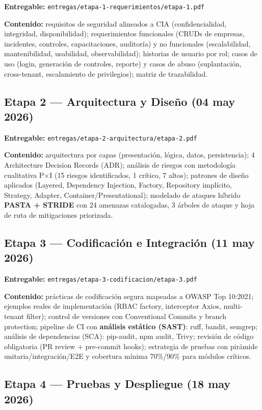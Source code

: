 \documentclass[12pt,a4paper,oneside]{article}
\begin{document}
\textbf{Entregable:} \texttt{entregas/etapa-1-requerimientos/etapa-1.pdf}

\textbf{Contenido:} requisitos de seguridad alineados a CIA (confidencialidad, integridad, disponibilidad); requerimientos funcionales (CRUDs de empresas, incidentes, controles, capacitaciones, auditoría) y no funcionales (escalabilidad, mantenibilidad, usabilidad, observabilidad); historias de usuario por rol; casos de uso (login, generación de controles, reporte) y casos de abuso (suplantación, cross-tenant, escalamiento de privilegios); matriz de trazabilidad.

\subsection{Etapa 2 — Arquitectura y Diseño (04 may 2026)}

\textbf{Entregable:} \texttt{entregas/etapa-2-arquitectura/etapa-2.pdf}

\textbf{Contenido:} arquitectura por capas (presentación, lógica, datos, persistencia); 4 Architecture Decision Records (ADR); análisis de riesgos con metodología cualitativa P×I (15 riesgos identificados, 1 crítico, 7 altos); patrones de diseño aplicados (Layered, Dependency Injection, Factory, Repository implícito, Strategy, Adapter, Container/Presentational); modelado de ataques híbrido \textbf{PASTA + STRIDE} con 24 amenazas catalogadas, 3 árboles de ataque y hoja de ruta de mitigaciones priorizada.

\subsection{Etapa 3 — Codificación e Integración (11 may 2026)}

\textbf{Entregable:} \texttt{entregas/etapa-3-codificacion/etapa-3.pdf}

\textbf{Contenido:} prácticas de codificación segura mapeadas a OWASP Top 10:2021; ejemplos reales de implementación (RBAC factory, interceptor Axios, multi-tenant filter); control de versiones con Conventional Commits y branch protection; pipeline de CI con \textbf{análisis estático (SAST)}: ruff, bandit, semgrep; análisis de dependencias (SCA): pip-audit, npm audit, Trivy; revisión de código obligatoria (PR review + pre-commit hooks); estrategia de pruebas con pirámide unitaria/integración/E2E y cobertura mínima 70\%/90\% para módulos críticos.

\subsection{Etapa 4 — Pruebas y Despliegue (18 may 2026)}
\end{document}
